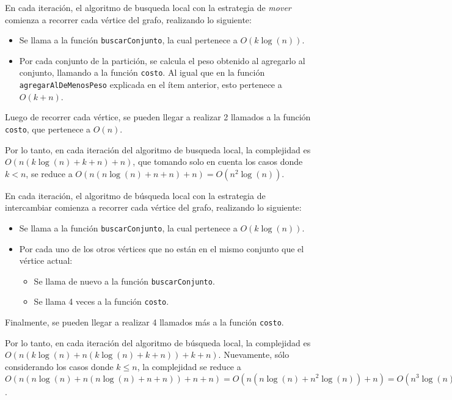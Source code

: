 \vspace*{0.3cm}

En cada iteración, el algoritmo de busqueda local con la estrategia de
\textit{mover} comienza a recorrer cada vértice del grafo, realizando lo siguiente:
\begin{itemize}
  \item Se llama a la función \texttt{buscarConjunto}, la cual pertenece a
  $O(k\log(n))$.

  \item Por cada conjunto de la partición, se calcula el peso obtenido al
  agregarlo al conjunto, llamando a la función \texttt{costo}. Al igual que en
  la función \texttt{agregarAlDeMenosPeso} explicada en el ítem anterior, esto
  pertenece a $O(k + n)$.
\end{itemize}

Luego de recorrer cada vértice, se pueden llegar a realizar 2 llamados a
la función \texttt{costo}, que pertenece a $O(n)$.

Por lo tanto, en cada iteración del algoritmo de busqueda local, la complejidad
es $O(n (k\log(n) + k + n) + n)$, que tomando solo en cuenta los casos donde
$k < n$, se reduce a $O(n (n\log(n) + n + n) + n) = O(n^2 \log(n))$.

\vspace*{0.3cm}

En cada iteración, el algoritmo de búsqueda local con la estrategia de
intercambiar comienza a recorrer cada vértice del grafo, realizando lo siguiente:

\begin{itemize}
  \item Se llama a la función \texttt{buscarConjunto}, la cual pertenece a
  $O(k\log(n))$.

  \item Por cada uno de los otros vértices que no están en el mismo conjunto
  que el vértice actual:

  \begin{itemize}
    \item Se llama de nuevo a la función \texttt{buscarConjunto}.

    \item Se llama 4 veces a la función \texttt{costo}.
  \end{itemize}
\end{itemize}

Finalmente, se pueden llegar a realizar 4 llamados más a la función
\texttt{costo}.

Por lo tanto, en cada iteración del algoritmo de búsqueda local, la complejidad
es $O(n (k\log(n) + n (k\log(n) + k + n)) + k + n)$. Nuevamente, sólo
considerando los casos donde $k \le n$, la complejidad se reduce a
$O(n(n\log(n) + n (n\log(n) + n + n)) + n + n) = O(n (n\log(n) + n^2 \log(n)) + n) = O(n^3 \log(n))$.

